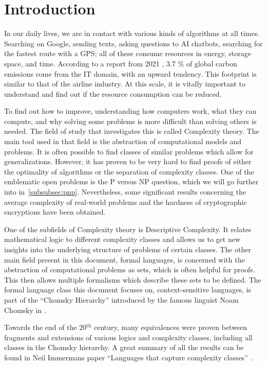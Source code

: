\chapter{Introduction}\label{ch:intro}

In our daily lives, we are in contact with various kinds of algorithms at all times.
Searching on Google, sending texts, asking questions to \acs{AI} chatbots, searching for the fastest route with a \acs{GPS}; all of these consume resources in energy, storage space, and time.
According to a report from 2021 \cite{webFootprint}, 3.7 \% of global carbon emissions come from the \acs{IT} domain, with an upward tendency.
This footprint is similar to that of the airline industry.
At this scale, it is vitally important to understand and find out if the resource consumption can be reduced.

To find out how to improve, understanding how computers work, what they can compute, and why solving some problems is more difficult than solving others is needed.
The field of study that investigates this is called Complexity theory.
The main tool used in that field is the abstraction of computational models and problems.
It is often possible to find classes of similar problems which allow for generalizations.
However, it has proven to be very hard to find proofs of either the optimality of algorithms or the separation of complexity classes.
One of the emblematic open problems is the P versus NP question, which we will go further into in~\cref{subsubsec:pnp}.
Nevertheless, some significant results concerning the average complexity of real-world problems and the hardness of cryptographic encryptions have been obtained.

One of the subfields of Complexity theory is Descriptive Complexity.
It relates mathematical logic to different complexity classes and allows us to get new insights into the underlying structure of problems of certain classes.
The other main field present in this document, formal languages, is concerned with the abstraction of computational problems as sets, which is often helpful for proofs.
This then allows multiple formalisms which describe these sets to be defined.
The formal language class this document focuses on, context-sensitive languages, is part of the ``Chomsky Hierarchy'' introduced by the famous linguist Noam Chomsky in \cite{Chomsky1959}.

Towards the end of the 20$^{\text{th}}$ century, many equivalences were proven between fragments and extensions of various logics and complexity classes, including all classes in the Chomsky hierarchy.
A great summary of all the results can be found in Neil Immermans paper ``Languages that capture complexity classes''~\cite{Immerman1987}.

